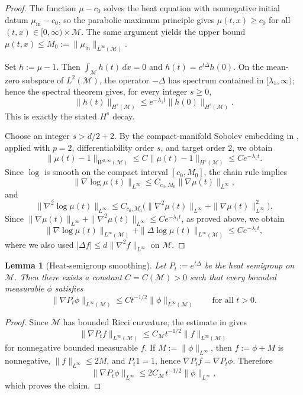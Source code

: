 \documentclass[11pt]{article}
\newtheorem{lemma}[theorem]{Lemma}
\theoremstyle{definition}
\def\M{\mathcal M}
\begin{document}
\begin{proof}
The function $\mu-c_0$ solves the heat equation with nonnegative initial datum $\mu_{\mathrm{in}}-c_0$, so the parabolic maximum principle gives $\mu(t,x)\ge c_0$ for all $(t,x)\in[0,\infty)\times \M$. The same argument yields the upper bound $\mu(t,x)\le M_0:=\|\mu_{\mathrm{in}}\|_{L^\infty( \M)}$.

Set $h:=\mu-1$. Then $\int_{ \M} h(t)\,dx=0$ and $h(t)=e^{t\Delta}h(0)$. On the mean-zero subspace of $L^2( \M)$, the operator $-\Delta$ has spectrum contained in $[ \lambda_1,\infty)$; hence the spectral theorem gives, for every integer $s\ge0$,
\[
\|h(t)\|_{H^s( \M)}
\le
e^{- \lambda_1t}\|h(0)\|_{H^s( \M)}.
\]
This is exactly the stated $H^s$ decay.

Choose an integer $s> d/2+2$. By the compact-manifold Sobolev embedding in
\cite[Theorem~6.3]{hebey_robert_2008}, applied with $p=2$, differentiability
order $s$, and target order $2$, we obtain
\[
\|\mu(t)-1\|_{W^{2,\infty}( \M)}
\le
C\|\mu(t)-1\|_{H^s( \M)}
\le
Ce^{- \lambda_1t}.
\]
Since $\log$ is smooth on the compact interval $[c_0,M_0]$, the chain rule implies
\[
\|\nabla \log \mu(t)\|_{L^\infty}
\le
C_{c_0,M_0}\|\nabla \mu(t)\|_{L^\infty},
\]
and
\[
\|\nabla^2 \log \mu(t)\|_{L^\infty}
\le
C_{c_0,M_0}\bigl(\|\nabla^2 \mu(t)\|_{L^\infty}+\|\nabla \mu(t)\|_{L^\infty}^2\bigr).
\]
Since $\|\nabla \mu(t)\|_{L^\infty}+\|\nabla^2 \mu(t)\|_{L^\infty}\le Ce^{- \lambda_1t}$, as proved above, we obtain
\[
\|\nabla \log \mu(t)\|_{L^\infty( \M)}
+
\|\Delta \log \mu(t)\|_{L^\infty( \M)}
\le
Ce^{- \lambda_1t},
\]
where we also used $|\Delta f|\le  d\|\nabla^2 f\|_{L^\infty}$ on  $\M$.
\end{proof}

\begin{lemma}[Heat-semigroup smoothing]\label{lem:heat_semigroup_smoothing}
Let $P_t:=e^{t\Delta}$ be the heat semigroup on  $\M$. Then there
exists a constant $C=C( \M)>0$ such that every bounded measurable $\phi$
satisfies
\[
\|\nabla P_t\phi\|_{L^\infty( \M)}
\le
C t^{-1/2}\|\phi\|_{L^\infty( \M)}
\qquad\text{for all }t>0.
\]
\end{lemma}

\begin{proof}
Since  $\M$ has bounded Ricci curvature, the estimate in
\cite[(1.3)]{wang2004gradient} gives
\[
\|\nabla P_t f\|_{L^\infty( \M)}
\le
C_{ \M}t^{-1/2}\|f\|_{L^\infty( \M)}
\]
for nonnegative bounded measurable $f$. If
$M:=\|\phi\|_{L^\infty}$, then $f:=\phi+M$ is nonnegative,
$\|f\|_{L^\infty}\le 2M$, and $P_t1=1$, hence
$\nabla P_t f=\nabla P_t\phi$. Therefore
\[
\|\nabla P_t\phi\|_{L^\infty}
\le
2C_{ \M}t^{-1/2}\|\phi\|_{L^\infty},
\]
which proves the claim.
\end{proof}
\end{document}
